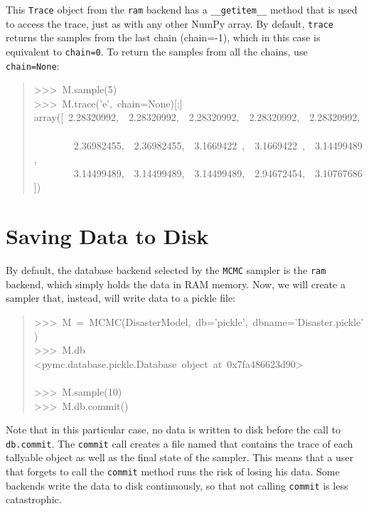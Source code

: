 This \texttt{Trace} object from the \texttt{ram} backend has a \texttt{{\_}{\_}getitem{\_}{\_}} method
that is used to access the trace, just as with any other NumPy array.
By default, \texttt{trace} returns the samples from
the last chain (chain=-1), which in this case is equivalent to \texttt{chain=0}. To
return the samples from all the chains, use \texttt{chain=None}:
\begin{quote}{\ttfamily \raggedright \noindent
>{}>{}>~M.sample(5)~\\
>{}>{}>~M.trace('e',~chain=None){[}:{]}~\\
array({[}~2.28320992,~~2.28320992,~~2.28320992,~~2.28320992,~~2.28320992,~\\
~~~~~~~~2.36982455,~~2.36982455,~~3.1669422~,~~3.1669422~,~~3.14499489,~\\
~~~~~~~~3.14499489,~~3.14499489,~~3.14499489,~~2.94672454,~~3.10767686{]})
}\end{quote}



\hypertarget{saving-data-to-disk}{}
\section*{Saving Data to Disk}
\label{saving-data-to-disk}

By default, the database backend selected by the \texttt{MCMC} sampler is the \texttt{ram}
backend, which simply holds the data in RAM memory. Now, we will create a
sampler that, instead, will write data to a pickle file:
\begin{quote}{\ttfamily \raggedright \noindent
>{}>{}>~M~=~MCMC(DisasterModel,~db='pickle',~dbname='Disaster.pickle')~\\
>{}>{}>~M.db~\\
<pymc.database.pickle.Database~object~at~0x7fa486623d90>~\\
~\\
>{}>{}>~M.sample(10)~\\
>{}>{}>~M.db.commit()
}\end{quote}

Note that in this particular case, no data is written to disk before the call
to \texttt{db.commit}. The \texttt{commit} call creates a file named 
that contains the trace of each tallyable object as well as the final state of
the sampler. This means that a user that forgets to call the \texttt{commit}
method runs the risk of losing his data. Some backends write the data to disk
continuously, so that not calling \texttt{commit} is less catastrophic.

